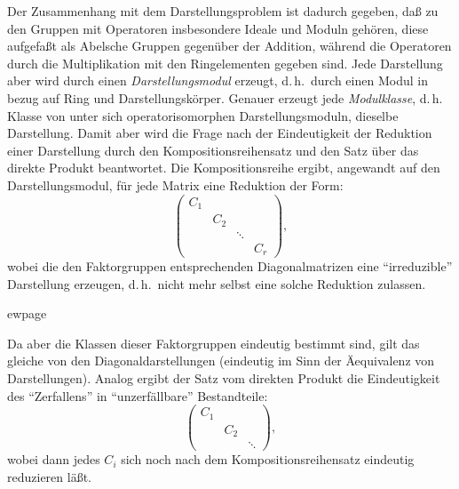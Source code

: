 \documentclass[12pt,a4paper]{article}
\theoremstyle{definition}
\begin{document}
Der Zusammenhang mit dem Darstellungsproblem ist dadurch gegeben, da\ss{}
zu den Gruppen mit Operatoren insbesondere Ideale und Moduln geh\"oren,
diese aufgefa\ss t als Abelsche Gruppen gegen\"uber der Addition, w\"ahrend
die Operatoren durch die Multiplikation mit den Ringelementen gegeben
sind. Jede Darstellung aber wird durch einen \textit{Darstellungsmodul}
erzeugt, d.\,h.\ durch einen Modul in bezug auf Ring und
Darstellungsk\"orper. Genauer erzeugt jede \textit{Modulklasse}, d.\,h. Klasse von unter sich operatorisomorphen Darstellungsmoduln, dieselbe
Darstellung. Damit aber wird die Frage nach der Eindeutigkeit der
Reduktion einer Darstellung durch den Kompositionsreihensatz und den Satz
\"uber das direkte Produkt beantwortet. Die Kompositionsreihe ergibt,
angewandt auf den Darstellungsmodul, f\"ur jede Matrix eine Reduktion der
Form:
\[
\begin{pmatrix}
C_1 & & & \\
& C_2 & & \\
& & \ddots & \\
& & & C_r
\end{pmatrix},
\]
wobei die den Faktorgruppen entsprechenden Diagonalmatrizen eine
``irreduzible'' Darstellung erzeugen, d.\,h.\ nicht mehr selbst eine
solche Reduktion zulassen.



ewpage
\setcounter{page}{576}

Da aber die Klassen dieser Faktorgruppen eindeutig bestimmt sind, gilt
das gleiche von den Diagonaldarstellungen (eindeutig im Sinn der
\"Aequivalenz von Darstellungen). Analog ergibt der Satz vom direkten
Produkt die Eindeutigkeit des ``Zerfallens'' in ``unzerf\"allbare''
Bestandteile:
\[
\begin{pmatrix}
C_1 & & \\
& C_2 & \\
& & \ddots
\end{pmatrix},
\]
wobei dann jedes $C_i$ sich noch nach dem Kompositionsreihensatz
eindeutig reduzieren l\"a\ss t.
\end{document}
